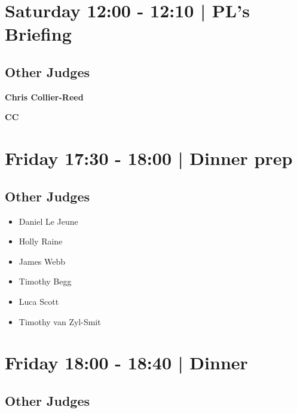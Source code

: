 \documentclass[10pt]{article}
\newcommand{\newtitle}[1]{\begin{center}{\Huge\bfseries #1 }\\ \vspace{5mm}\end{center}}
\newcommand{\newsubtitle}[1]{\begin{center}{\color{grey}\Large\bfseries #1 }\\ \vspace{5mm}\end{center}}
\begin{document}
            \section*{Saturday 12:00
        -
        12:10
        |
         PL's Briefing}
        
                
        \subsection*{Other Judges}
        
            \begin{itemize}
                        \end{itemize}
        

    
	\clearpage

		\newtitle{Chris Collier-Reed}
	\newsubtitle{CC}

            \section*{Friday 17:30
        -
        18:00
        |
         Dinner prep}
        
                
        \subsection*{Other Judges}
        
            \begin{itemize}
                            \item Daniel Le Jeune
                            \item Holly Raine
                            \item James Webb
                            \item Timothy Begg
                            \item Luca Scott
                            \item Timothy van Zyl-Smit
                        \end{itemize}
        

            \section*{Friday 18:00
        -
        18:40
        |
         Dinner }
        
                
        \subsection*{Other Judges}
        
\end{document}
